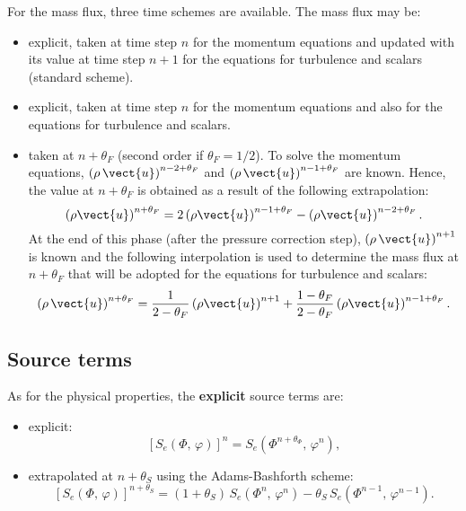 For the mass flux, three time schemes are available. The mass flux may be:
%
\begin{itemize}
\item explicit, taken at time step $n$ for the momentum equations and
updated with its value at time step $n+1$ for the equations for turbulence
and scalars (standard scheme).

\item explicit, taken at time step $n$ for the momentum equations and
also for the equations for turbulence and scalars.

\item taken at $n+\theta_{F}$ (second order if $\theta_{F}=1/2$). To
solve the momentum equations, $\left(\rho\,\vect{u}\right)^{n-2+\theta_{F}}$ and
$\left(\rho\,\vect{u}\right)^{n-1+\theta_{F}}$ are known. Hence, the value at
$n+\theta_{F}$ is obtained as a result of the following extrapolation:
\begin{equation}
\left(\rho\vect{u}\right)^{n+\theta_{F}}
= 2 \left(\rho \vect{u}\right)^{n-1+\theta_{F}}
- \left(\rho \vect{u}\right)^{n-2+\theta_{F}}.
\end{equation}
At the end of this phase (after the pressure correction step),
$\left(\rho\,\vect{u}\right)^{n+1}$ is known and the following interpolation is used to
determine the mass flux at $n+\theta_{F}$ that will be adopted for the
equations for turbulence and scalars:
\begin{equation}
\left(\rho\,\vect{u}\right)^{n+\theta_{F}}= \dfrac{1}{2-\theta_{F}}
   \left(\rho \vect{u}\right)^{n+1}
+\frac{1-\theta_{F}}{2-\theta_{F}} \left(\rho \vect{u}\right)^{n-1+\theta_{F}}.
\end{equation}
\end{itemize}

\subsection{Source terms}

As for the physical properties, the \textbf{explicit} source terms are:

\begin{itemize}
\item explicit:
\begin{equation}
\left[ S_{e} \left(\Phi , \, \varphi \right) \right]^{n}=S_{e}\left(\Phi ^{n+\theta_{\Phi }}, \, \varphi^{n} \right),
\end{equation}

\item extrapolated at $n+\theta _{S}$ using the Adams-Bashforth scheme:
\begin{equation}
\left[ S_{e} \left(\Phi , \, \varphi \right) \right]^{n+\theta _{S}}=\left(1+\theta _{S}\right)\,
S_{e}\left(\Phi^{n}, \, \varphi^{n}\right)-\theta _{S}\,S_{e} \left(\Phi ^{n-1} , \,\varphi ^{n-1}\right) .
\end{equation}
\end{itemize}

